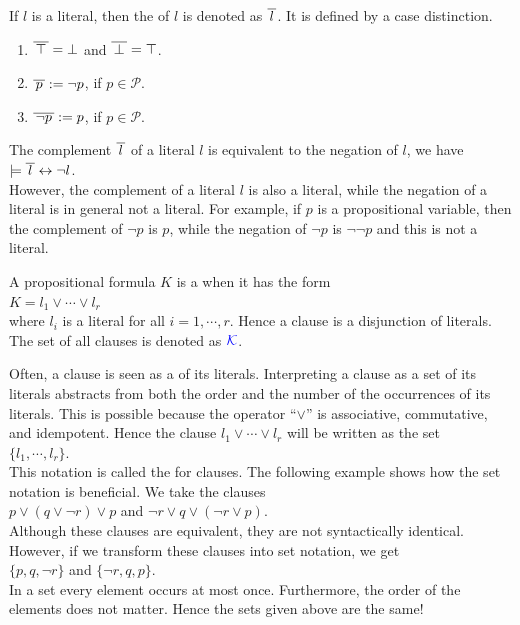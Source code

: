 If  $l$ is a literal, then the  of $l$ is denoted as $\overline{\,l\,}$.
It is defined by a case distinction.
\begin{enumerate}
\item $\overline{\,\top\,} = \bot$ \quad and \quad $\overline{\,\bot\,} = \top$. 
\item $\overline{\,p\,} := \neg p$, \quad if $p \in \mathcal{P}$.
\item $\overline{\,\neg p\,} := p$, \quad if $p \in \mathcal{P}$.
\end{enumerate}
The complement $\overline{\,l\,}$ of a literal $l$ is equivalent to the negation of $l$, we have
\\[0.2cm]
\hspace*{1.3cm}
$\models \overline{\,l\,} \leftrightarrow \neg l$.
\\[0.2cm]
However, the complement of a literal $l$ is also a literal, while the negation of a literal is in general not a
literal. For example, if $p$ is a propositional variable, then the complement of $\neg p$ is $p$, while the
negation of $\neg p$ is $\neg \neg p$ and this is not a literal.

\begin{Definition}[Clause]
  A propositional formula $K$ is a  when it has the form \\[0.2cm]
  \hspace*{1.3cm} $K = l_1 \vee \cdots \vee l_r$ \\[0.2cm]
  where $l_i$ is a literal for all $i=1,\cdots,r$.  Hence a clause is a disjunction of literals.
  The set of all clauses is denoted as  ${\color{blue}\mathcal{K}}$.
  \eox
\end{Definition}

Often, a clause is seen as a  of its literals.  Interpreting a clause as a set of its literals
abstracts from both the order and the number of the occurrences of its literals.
This is possible because the operator ``$\vee$'' is associative, commutative, and idempotent.  
Hence the clause  $l_1 \vee \cdots \vee l_r$ will be written as the set
\\[0.2cm]
\hspace*{1.3cm} $\{ l_1, \cdots, l_r \}$.
\\[0.2cm]
This notation is called the  for clauses.  
The following example shows how the set notation is beneficial.  We take the clauses
\\[0.2cm]
\hspace*{1.3cm}
$p \vee (q \vee \neg r) \vee p$ \quad and \quad $\neg r \vee q \vee (\neg r \vee p)$. 
\\[0.2cm]
Although these clauses are equivalent, they are not syntactically identical.  However, if we transform these
clauses into set notation, we get
\\[0.2cm]
\hspace*{1.3cm}
$\{p, q, \neg r \}$ \quad and \quad $\{ \neg r, q, p \}$. 
\\[0.2cm]
In a set every element occurs at most once.  Furthermore, the order of the elements does not matter.
Hence the sets given above are the same!

